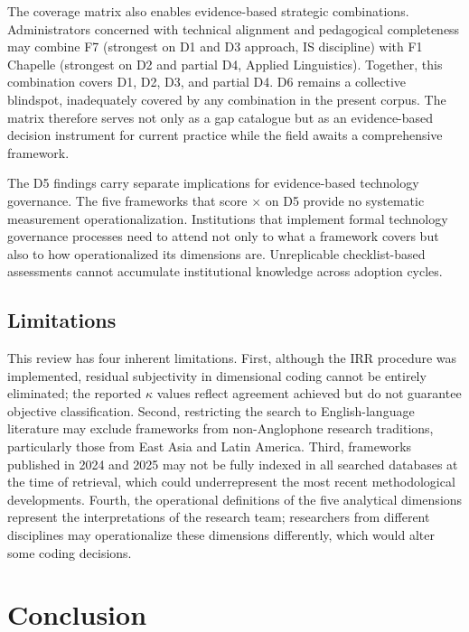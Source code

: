\documentclass[conference]{IEEEtran}
\newcommand{\nocov}{\textcolor{nonecol}{\textbf{$\times$}}}
\begin{document}
The coverage matrix also enables evidence-based strategic combinations.
Administrators concerned with technical alignment and pedagogical
completeness may combine F7 (strongest on D1 and D3 approach, IS
discipline) with F1 Chapelle (strongest on D2 and partial D4, Applied
Linguistics). Together, this combination covers D1, D2, D3, and
partial D4. D6 remains a collective blindspot, inadequately covered by
any combination in the present corpus. The matrix therefore serves not
only as a gap catalogue but as an evidence-based decision instrument
for current practice while the field awaits a comprehensive framework.

The D5 findings carry separate implications for evidence-based
technology governance. The five frameworks that score \nocov{} on D5
provide no systematic measurement operationalization. Institutions
that implement formal technology governance processes need to attend
not only to what a framework covers but also to how operationalized
its dimensions are. Unreplicable checklist-based assessments cannot
accumulate institutional knowledge across adoption cycles.

\subsection{Limitations}

This review has four inherent limitations. First, although the
IRR procedure was implemented, residual subjectivity in dimensional
coding cannot be entirely eliminated; the reported $\kappa$ values
reflect agreement achieved but do not guarantee objective
classification. Second, restricting the search to English-language
literature may exclude frameworks from non-Anglophone research
traditions, particularly those from East Asia and Latin America.
Third, frameworks published in 2024 and 2025 may not be fully indexed
in all searched databases at the time of retrieval, which could
underrepresent the most recent methodological developments. Fourth,
the operational definitions of the five analytical dimensions represent
the interpretations of the research team; researchers from different
disciplines may operationalize these dimensions differently, which
would alter some coding decisions.


\section{Conclusion}
\label{sec:conclusion}
\end{document}
